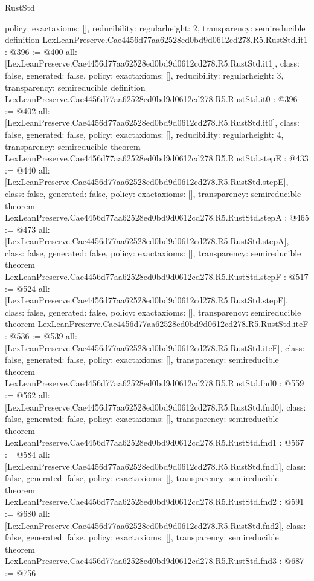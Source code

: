 \begin{lexlean}{RustStd}
\begin{coremodule}
{  policy: exact{axioms: []},
  reducibility: regular{height: 2},
  transparency: semireducible
}
definition LexLeanPreserve.Cae4456d77aa62528ed0bd9d0612cd278.R5.RustStd.it1 : @396 := @400 {
  all: [LexLeanPreserve.Cae4456d77aa62528ed0bd9d0612cd278.R5.RustStd.it1],
  class: false,
  generated: false,
  policy: exact{axioms: []},
  reducibility: regular{height: 3},
  transparency: semireducible
}
definition LexLeanPreserve.Cae4456d77aa62528ed0bd9d0612cd278.R5.RustStd.it0 : @396 := @402 {
  all: [LexLeanPreserve.Cae4456d77aa62528ed0bd9d0612cd278.R5.RustStd.it0],
  class: false,
  generated: false,
  policy: exact{axioms: []},
  reducibility: regular{height: 4},
  transparency: semireducible
}
theorem LexLeanPreserve.Cae4456d77aa62528ed0bd9d0612cd278.R5.RustStd.stepE : @433 := @440 {
  all: [LexLeanPreserve.Cae4456d77aa62528ed0bd9d0612cd278.R5.RustStd.stepE],
  class: false,
  generated: false,
  policy: exact{axioms: []},
  transparency: semireducible
}
theorem LexLeanPreserve.Cae4456d77aa62528ed0bd9d0612cd278.R5.RustStd.stepA : @465 := @473 {
  all: [LexLeanPreserve.Cae4456d77aa62528ed0bd9d0612cd278.R5.RustStd.stepA],
  class: false,
  generated: false,
  policy: exact{axioms: []},
  transparency: semireducible
}
theorem LexLeanPreserve.Cae4456d77aa62528ed0bd9d0612cd278.R5.RustStd.stepF : @517 := @524 {
  all: [LexLeanPreserve.Cae4456d77aa62528ed0bd9d0612cd278.R5.RustStd.stepF],
  class: false,
  generated: false,
  policy: exact{axioms: []},
  transparency: semireducible
}
theorem LexLeanPreserve.Cae4456d77aa62528ed0bd9d0612cd278.R5.RustStd.iteF : @536 := @539 {
  all: [LexLeanPreserve.Cae4456d77aa62528ed0bd9d0612cd278.R5.RustStd.iteF],
  class: false,
  generated: false,
  policy: exact{axioms: []},
  transparency: semireducible
}
theorem LexLeanPreserve.Cae4456d77aa62528ed0bd9d0612cd278.R5.RustStd.fnd0 : @559 := @562 {
  all: [LexLeanPreserve.Cae4456d77aa62528ed0bd9d0612cd278.R5.RustStd.fnd0],
  class: false,
  generated: false,
  policy: exact{axioms: []},
  transparency: semireducible
}
theorem LexLeanPreserve.Cae4456d77aa62528ed0bd9d0612cd278.R5.RustStd.fnd1 : @567 := @584 {
  all: [LexLeanPreserve.Cae4456d77aa62528ed0bd9d0612cd278.R5.RustStd.fnd1],
  class: false,
  generated: false,
  policy: exact{axioms: []},
  transparency: semireducible
}
theorem LexLeanPreserve.Cae4456d77aa62528ed0bd9d0612cd278.R5.RustStd.fnd2 : @591 := @680 {
  all: [LexLeanPreserve.Cae4456d77aa62528ed0bd9d0612cd278.R5.RustStd.fnd2],
  class: false,
  generated: false,
  policy: exact{axioms: []},
  transparency: semireducible
}
theorem LexLeanPreserve.Cae4456d77aa62528ed0bd9d0612cd278.R5.RustStd.fnd3 : @687 := @756 {
}
\end{coremodule}
\end{lexlean}
